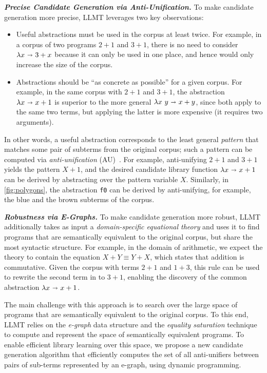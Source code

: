 \documentclass[acmsmall,screen,nonacm,review=false,timestamp=false]{acmart}
\newcommand{\emphbf}[1]{\emph{\textbf{#1}\xspace}}
\newcommand{\mypara}[1]{\smallskip\noindent\emphbf{#1.}\xspace}
\newcommand{\T}[1]{\mbox{\lstinline^#1^}}
\newcommand{\semeq}{\equiv}
\newcommand{\bnd}{\ \mathbf{\shortrightarrow}\ }
\begin{document}
\mypara{Precise Candidate Generation via Anti-Unification}
To make candidate generation more precise,
LLMT leverages two key observations:
\begin{itemize}
    \item
    Useful abstractions must be used in the corpus at least twice.
For example, in a corpus of two programs $2 + 1$ and $3 + 1$,
    there is no need to consider $\lambda x \bnd 3 + x$
    because it can only be used in one place,
    and hence would only increase the size of the corpus.
\item
    Abstractions should be ``as concrete as possible'' for a given corpus.
    For example,
     in the same corpus with $2 + 1$ and $3 + 1$,
     the abstraction $\lambda x \bnd x + 1$
     is superior to the more general
     $\lambda x\ y \bnd x + y$,
     since both apply to the same two terms,
     but applying the latter is more expensive (it requires two arguments).
\end{itemize}
In other words, a useful abstraction corresponds to the least general \emph{pattern}
that matches some pair of subterms from the original corpus;
such a pattern can be computed via \emph{anti-unification} (AU)~\cite{plotkin1970lattice}.
For example, anti-unifying $2 + 1$ and $3 + 1$
  yields the pattern $X + 1$,
  and the desired candidate library function $\lambda x \bnd x + 1$
  can be derived by abstracting over the pattern variable $X$.
Similarly, in \autoref{fig:polygons}, the abstraction \T{f0} can be derived
 by anti-unifying, for example, the blue and the brown subterms of the corpus.


\mypara{Robustness via E-Graphs}
To make candidate generation more robust,
LLMT additionally takes as input a \emph{domain-specific equational theory} and uses it to find programs that are semantically equivalent to the original corpus,
but share the most syntactic structure.
For example, in the domain of arithmetic, we expect the theory to contain the equation
$X + Y  \semeq  Y + X$,
which states that addition is commutative.
Given the corpus with terms $2 + 1$ and $1 + 3$,
this rule can be used to rewrite the second term in to $3 + 1$,
enabling the discovery of the common abstraction $\lambda x \bnd x + 1$.



The main challenge with this approach is to search over the large space of programs
that are semantically equivalent to the original corpus.
To this end, LLMT relies on the \emph{e-graph} data structure
and the \emph{equality saturation} technique~\cite{tate2009equality,willsey2021egg}
to compute and represent the space of semantically equivalent programs.
To enable efficient library learning over this space,
we propose a new candidate generation algorithm
that efficiently computes the set of all anti-unifiers
between pairs of sub-terms represented by an e-graph,
using dynamic programming.
\end{document}
